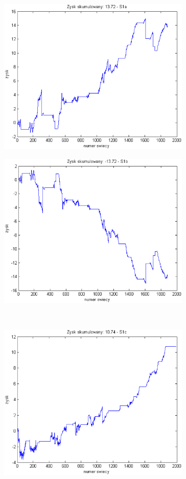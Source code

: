 \documentclass{tewiart}
\begin{document}
\FloatBarrier
\begin{figure}[h]
\centering
\begin{minipage}{.49\linewidth}
\centering
\includegraphics[width=0.82\textwidth]{images/nzdjpyS1a.eps}
\label{jedno}
\end{minipage}
\begin{minipage}{.49\linewidth}
\centering
\includegraphics[width=0.82\textwidth]{images/nzdjpyS1b.eps}
\label{dwu}
\end{minipage}
\\
\begin{minipage}{.49\linewidth}
\centering
\includegraphics[width=0.82\textwidth]{images/nzdjpyS1c.eps}

\end{minipage}
\end{figure}
\end{document}
